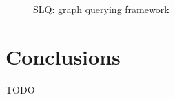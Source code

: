 \documentclass{sig-alternate}
\begin{document}
\begin{figure}
\centering
{}
\caption{SLQ: graph querying framework}
\label{fig:distgraphperf}
\end{figure}


\section{Conclusions}
TODO


%

%
%
\end{document}
